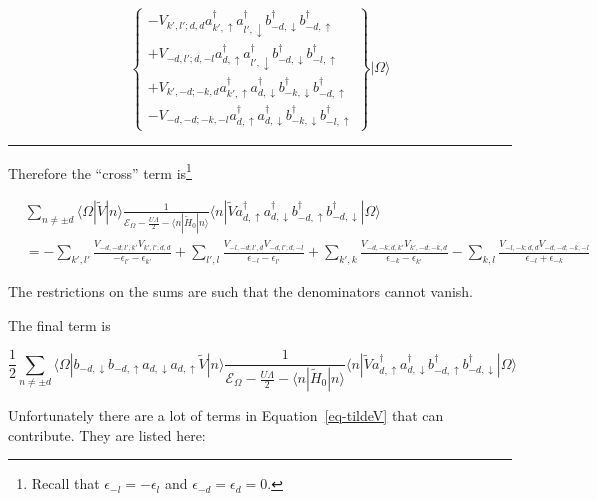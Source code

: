 \documentclass[
  letterpaper,
  DIV=11,
  numbers=noendperiod]{scrartcl}
\begin{document}
\begin{equation}
\left\{
\begin{matrix}
-V_{k',l';d,d}a^\dagger_{k',\uparrow}a^\dagger_{l',\downarrow}b^\dagger_{-d,\downarrow}b^\dagger_{-d,\uparrow}\\
+V_{-d,l';d,-l}a^\dagger_{d,\uparrow}a^\dagger_{l',\downarrow}b^\dagger_{-d,\downarrow}b^\dagger_{-l,\uparrow}\\
+V_{k',-d;-k,d}a^\dagger_{k',\uparrow}a^\dagger_{d,\downarrow}b^\dagger_{-k,\downarrow}b^\dagger_{-d,\uparrow}\\
-V_{-d,-d;-k,-l}a^\dagger_{d,\uparrow}a^\dagger_{d,\downarrow}b^\dagger_{-k,\downarrow}b^\dagger_{-l,\uparrow}
\end{matrix}
\right\}
|\Omega\rangle
\end{equation}

\begin{center}\rule{0.5\linewidth}{0.5pt}\end{center}

Therefore the ``cross'' term is\footnote{Recall that
  \(\epsilon_{-l}=-\epsilon_{l}\) and \(\epsilon_{-d}=\epsilon_{d}=0\).}

\[
\boxed{
\begin{align}
&\sum_{n\ne \pm d}\langle\Omega|\tilde V|n\rangle\frac{1}{\mathcal{E}_\Omega-\frac{U\Lambda}{2}-\langle n|\tilde H_0|n\rangle}\langle n|\tilde Va^\dagger_{d,\uparrow}a^\dagger_{d,\downarrow}b^\dagger_{-d,\uparrow}b^\dagger_{-d,\downarrow}|\Omega\rangle\\
&=-\sum_{k',l'}\frac{V_{-d,-d;l',k'}V_{k',l';d,d}}{-\epsilon_{l'}-\epsilon_{k'}}
+\sum_{l',l}\frac{V_{-l,-d;l',d}V_{-d,l';d,-l}}{\epsilon_{-l}-\epsilon_{l'}}
+\sum_{k',k}\frac{V_{-d,-k;d,k'}V_{k',-d;-k,d}}{\epsilon_{-k}-\epsilon_{k'}}
-\sum_{k,l}\frac{V_{-l,-k;d,d}V_{-d,-d;-k,-l}}{\epsilon_{-l}+\epsilon_{-k}}
\end{align}
}
\]

The restrictions on the sums are such that the denominators cannot
vanish.

The final term is

\begin{equation}
\frac{1}{2}\sum_{n\ne \pm d}\langle\Omega|b_{-d,\downarrow}b_{-d,\uparrow}a_{d,\downarrow}a_{d,\uparrow}\tilde V|n\rangle\frac{1}{\mathcal{E}_\Omega-\frac{U\Lambda}{2}-\langle n|\tilde H_0|n\rangle}\langle n|\tilde Va^\dagger_{d,\uparrow}a^\dagger_{d,\downarrow}b^\dagger_{-d,\uparrow}b^\dagger_{-d,\downarrow}|\Omega\rangle
\end{equation}

Unfortunately there are a lot of terms in Equation~\ref{eq-tildeV} that
can contribute. They are listed here:
\end{document}
